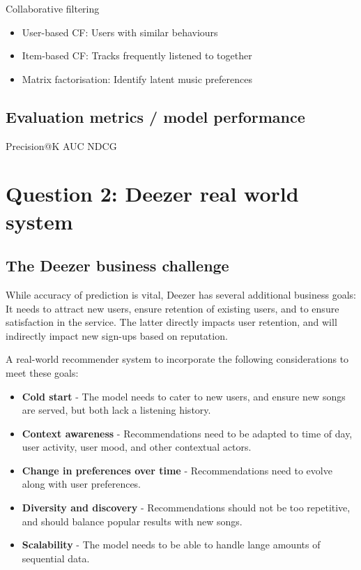 \documentclass[
]{ceurart}
\begin{document}
Collaborative filtering
\begin{itemize}
    \item User-based CF: Users with similar behaviours
    \item Item-based CF: Tracks frequently listened to together
    \item Matrix factorisation: Identify latent music preferences
\end{itemize}

\subsection{Evaluation metrics / model performance}

Precision@K
AUC
NDCG

\section{Question 2: Deezer real world system}

\subsection{The Deezer business challenge}

While accuracy of prediction is vital, Deezer has several additional business goals: It needs to attract new users, ensure retention of existing users, and to ensure satisfaction in the service. The latter directly impacts user retention, and will indirectly impact new sign-ups based on reputation. 

A real-world recommender system to incorporate the following considerations to meet these goals:

\begin{itemize}
    \item \textbf{Cold start} - The model needs to cater to new users, and ensure new songs are served, but both lack a listening history.
    \item \textbf{Context awareness} - Recommendations need to be adapted to time of day, user activity, user mood, and other contextual actors.
    \item \textbf{Change in preferences over time} - Recommendations need to evolve along with user preferences.
    \item \textbf{Diversity and discovery} - Recommendations should not be too repetitive, and should balance popular results with new songs.
    \item \textbf{Scalability} - The model needs to be able to handle lange amounts of sequential data.
\end{itemize}
\end{document}
